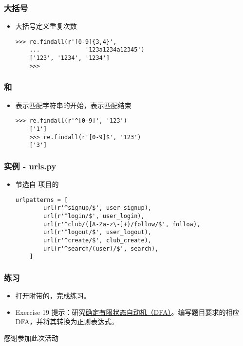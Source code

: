 \begin{frame} [fragile]
	\frametitle{大括号}
	\linespread{1.5}
	\begin{itemize}
	\item 大括号定义重复次数
	\begin{lstlisting}[style=pythonstyle, gobble=4, texcl]
	>>> re.findall(r'[0-9]{3,4}', 
	... 			'123a1234a12345')
	['123', '1234', '1234']
	>>> 
	\end{lstlisting}
	\end{itemize}
\end{frame}

\begin{frame} [fragile]
	\frametitle{\inlineBash{^} 和 \inlineBash{$}}
	\linespread{1.5}
	\begin{itemize}
	\item \inlineBash{^}表示匹配字符串的开始，\inlineBash{$}表示匹配结束
	\begin{lstlisting}[style=pythonstyle, gobble=4, texcl]
	>>> re.findall(r'^[0-9]', '123')
	['1']
	>>> re.findall(r'[0-9]$', '123')
	['3']
	\end{lstlisting}
	\end{itemize}
\end{frame}

\begin{frame} [fragile]
	\frametitle{实例 - urls.py}
	\linespread{1.5}
	\begin{itemize}
	\item 节选自 \href{https://github.com/lxylxy123456/shierquan/}
			{} 项目的
			\href{https://github.com/lxylxy123456/shierquan/blob/master/quan\_account/urls.py}
			{}
	\begin{lstlisting}[style=pythonstyle, gobble=4, texcl]
	urlpatterns = [
		url(r'^signup/$', user_signup),
		url(r'^login/$', user_login),
		url(r'^club/([A-Za-z\-]+)/follow/$', follow),
		url(r'^logout/$', user_logout),
		url(r'^create/$', club_create),
		url(r'^search/(user)/$', search),
	]
	\end{lstlisting}
	\end{itemize}
\end{frame}

\begin{frame} [fragile]
	\frametitle{练习}
	\linespread{1.5}
	\begin{itemize}
	\item 打开附带的\href{https://github.com/lxylxy123456/HCCTalks/blob/master/RegExpTalk01.html}
						{}，完成练习。
	\item Exercise 19 提示：研究\href{https://zh.wikipedia.org/wiki/\%E7\%A1\%AE\%E5\%AE\%9A\%E6\%9C\%89\%E9\%99\%90\%E7\%8A\%B6\%E6\%80\%81\%E8\%87\%AA\%E5\%8A\%A8\%E6\%9C\%BA}
	{确定有限状态自动机（DFA）}。编写题目要求的相应DFA，并将其转换为正则表达式。
	\end{itemize}
\end{frame}

\PreLastFrame
\begin{frame}
	\centerline{\fontsize{32}{32}\selectfont 感谢参加此次活动}
\end{frame}

\newpage


